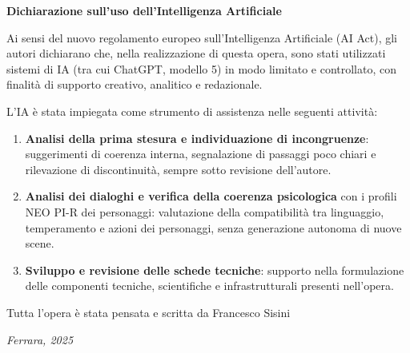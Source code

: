 \clearpage
\thispagestyle{empty}

\begin{center}
\vspace*{2cm}
{\Large \textbf{Dichiarazione sull’uso dell’Intelligenza Artificiale}}\\[1.5cm]
\end{center}

Ai sensi del nuovo regolamento europeo sull’Intelligenza Artificiale (AI Act),
gli autori dichiarano che, nella realizzazione di questa opera, sono stati
utilizzati sistemi di IA (tra cui ChatGPT, modello 5) in modo limitato e
controllato, con finalità di supporto creativo, analitico e redazionale.

L’IA  \`e stata impiegata come strumento di assistenza nelle seguenti attività:

\begin{enumerate}
  \item \textbf{Analisi della prima stesura e individuazione di incongruenze}:  
  suggerimenti di coerenza interna, segnalazione di passaggi poco chiari e
  rilevazione di discontinuità, sempre sotto revisione dell’autore.

  \item \textbf{Analisi dei dialoghi e verifica della coerenza psicologica}  
  con i profili NEO PI-R dei personaggi:  
  valutazione della compatibilità tra linguaggio, temperamento e azioni dei
  personaggi, senza generazione autonoma di nuove scene.

  \item \textbf{Sviluppo e revisione delle schede tecniche}:  
  supporto nella formulazione delle componenti tecniche, scientifiche e
  infrastrutturali presenti nell’opera.
\end{enumerate}

Tutta l'opera \`e stata pensata e scritta da Francesco Sisini

\medskip
\begin{flushright}
\textit{Ferrara, 2025}
\end{flushright}

\clearpage
